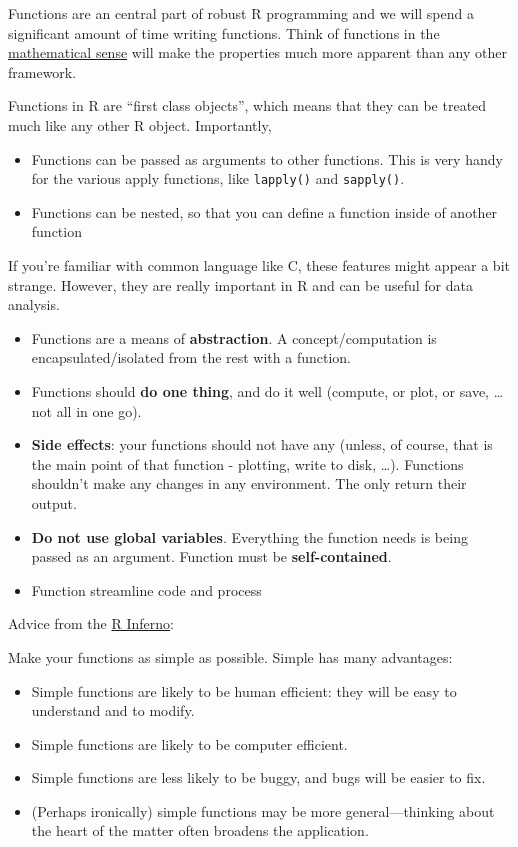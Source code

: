 \documentclass[]{book}
\providecommand{\tightlist}{%
  \setlength{\itemsep}{0pt}\setlength{\parskip}{0pt}}
\begin{document}
Functions are an central part of robust R programming and we will spend
a significant amount of time writing functions. Think of functions in
the
\href{https://en.wikipedia.org/wiki/Function_(mathematics)}{mathematical
sense} will make the properties much more apparent than any other
framework.

Functions in R are ``first class objects'', which means that they can be
treated much like any other R object. Importantly,

\begin{itemize}
\item
  Functions can be passed as arguments to other functions. This is very
  handy for the various apply functions, like \texttt{lapply()} and
  \texttt{sapply()}.
\item
  Functions can be nested, so that you can define a function inside of
  another function
\end{itemize}

If you're familiar with common language like C, these features might
appear a bit strange. However, they are really important in R and can be
useful for data analysis.

\begin{itemize}
\tightlist
\item
  Functions are a means of \textbf{abstraction}. A concept/computation
  is encapsulated/isolated from the rest with a function.
\item
  Functions should \textbf{do one thing}, and do it well (compute, or
  plot, or save, \ldots{} not all in one go).
\item
  \textbf{Side effects}: your functions should not have any (unless, of
  course, that is the main point of that function - plotting, write to
  disk, \ldots{}). Functions shouldn't make any changes in any
  environment. The only return their output.
\item
  \textbf{Do not use global variables}. Everything the function needs is
  being passed as an argument. Function must be \textbf{self-contained}.
\item
  Function streamline code and process
\end{itemize}

Advice from the
\href{http://www.burns-stat.com/pages/Tutor/R_inferno.pdf}{R Inferno}:

Make your functions as simple as possible. Simple has many advantages:

\begin{itemize}
\tightlist
\item
  Simple functions are likely to be human efficient: they will be easy
  to understand and to modify.
\item
  Simple functions are likely to be computer efficient.
\item
  Simple functions are less likely to be buggy, and bugs will be easier
  to fix.
\item
  (Perhaps ironically) simple functions may be more general---thinking
  about the heart of the matter often broadens the application.
\end{itemize}
\end{document}
